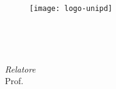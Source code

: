 
\begin{titlepage}

\begin{center}

\begin{LARGE}
\textbf{\myUni}\\
\end{LARGE}

\vspace{10pt}

\begin{Large}
\textsc{\myDepartment}\\
\end{Large}

\vspace{10pt}

\begin{large}
\textsc{\myFaculty}\\
\end{large}

\vspace{30pt}
\begin{figure}[htbp]
\begin{center}
\texttt{[image: logo-unipd]}
\end{center}
\end{figure}
\vspace{10pt} 

\begin{LARGE}
\begin{center}
\textbf{\myTitle}\\
\end{center}
\end{LARGE}

\vspace{10pt} 

\begin{large}
\textsl{\myDegree}\\
\end{large}

\vspace{40pt} 

\begin{large}
\begin{flushleft}
\textit{Relatore}\\ 
\vspace{5pt} 
Prof. \myProf
\end{flushleft}


\end{large}
\end{center}
\end{titlepage}
